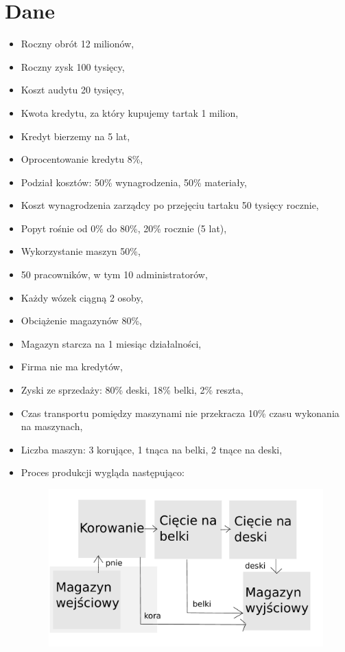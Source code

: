 \documentclass[a4paper]{article}
\begin{document}

\section{Dane}
\begin{itemize}
\item Roczny obrót 12 milionów,
\item Roczny zysk 100 tysięcy,
\item Koszt audytu 20 tysięcy,
\item Kwota kredytu, za który kupujemy tartak 1 milion,
\item Kredyt bierzemy na 5 lat,
\item Oprocentowanie kredytu 8\%,
\item Podział kosztów: 50\% wynagrodzenia, 50\% materiały,
\item Koszt wynagrodzenia zarządcy po przejęciu tartaku 50 tysięcy rocznie,
\item Popyt rośnie od 0\% do 80\%, 20\% rocznie (5 lat),
\item Wykorzystanie maszyn 50\%,
\item 50 pracowników, w tym 10 administratorów,
\item Każdy wózek ciągną 2 osoby,
\item Obciążenie magazynów 80\%,
\item Magazyn starcza na 1 miesiąc działalności,
\item Firma nie ma kredytów,
\item Zyski ze sprzedaży: 80\% deski, 18\% belki, 2\% reszta,
\item Czas transportu pomiędzy maszynami nie przekracza 10\% czasu wykonania na maszynach,
\item Liczba maszyn: 3 korujące, 1 tnąca na belki, 2 tnące na deski,
\item Proces produkcji wygląda następująco:
\begin{figure}[H]
\centering
\includegraphics[scale=0.5]{img/Tartak.pdf}
\end{figure}
\end{itemize}
\end{document}
